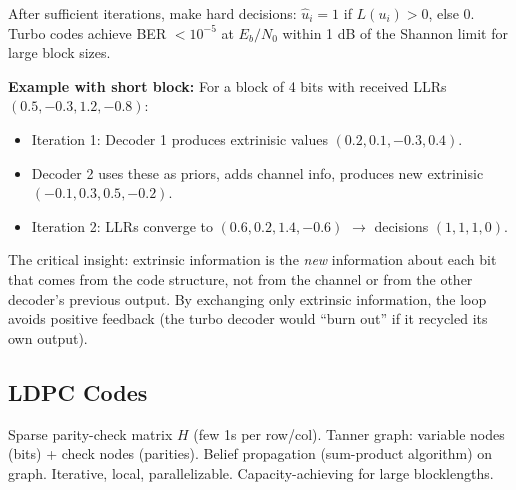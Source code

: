 \begin{example}
After sufficient iterations, make hard decisions: $\hat{u}_i = 1$ if $L(u_i) > 0$, else $0$. Turbo codes achieve BER $< 10^{-5}$ at $E_b/N_0$ within 1 dB of the Shannon limit for large block sizes.

\textbf{Example with short block:} For a block of 4 bits with received LLRs $(0.5, -0.3, 1.2, -0.8)$:
\begin{itemize}
\item Iteration 1: Decoder 1 produces extrinisic values $(0.2, 0.1, -0.3, 0.4)$.
\item Decoder 2 uses these as priors, adds channel info, produces new extrinisic $(-0.1, 0.3, 0.5, -0.2)$.
\item Iteration 2: LLRs converge to $(0.6, 0.2, 1.4, -0.6)$ $\to$ decisions $(1, 1, 1, 0)$.
\end{itemize}

The critical insight: extrinsic information is the \emph{new} information about each bit that comes from the code structure, not from the channel or from the other decoder's previous output. By exchanging only extrinsic information, the loop avoids positive feedback (the turbo decoder would ``burn out'' if it recycled its own output).
\end{example}

\subsection{LDPC Codes}
\label{sec:ec:ldpc}

Sparse parity-check matrix $H$ (few 1s per row/col). Tanner graph: variable nodes (bits) + check nodes (parities). Belief propagation (sum-product algorithm) on graph. Iterative, local, parallelizable. Capacity-achieving for large blocklengths.

